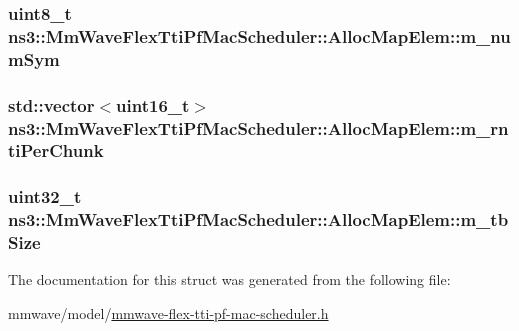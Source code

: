 \subsubsection[{\texorpdfstring{m\+\_\+num\+Sym}{m_numSym}}]{\setlength{\rightskip}{0pt plus 5cm}uint8\+\_\+t ns3\+::\+Mm\+Wave\+Flex\+Tti\+Pf\+Mac\+Scheduler\+::\+Alloc\+Map\+Elem\+::m\+\_\+num\+Sym}\hypertarget{structns3_1_1MmWaveFlexTtiPfMacScheduler_1_1AllocMapElem_a5c5cc7e33f85b68a50f52c334e025126}{}\label{structns3_1_1MmWaveFlexTtiPfMacScheduler_1_1AllocMapElem_a5c5cc7e33f85b68a50f52c334e025126}
\subsubsection[{\texorpdfstring{m\+\_\+rnti\+Per\+Chunk}{m_rntiPerChunk}}]{\setlength{\rightskip}{0pt plus 5cm}std\+::vector$<$uint16\+\_\+t$>$ ns3\+::\+Mm\+Wave\+Flex\+Tti\+Pf\+Mac\+Scheduler\+::\+Alloc\+Map\+Elem\+::m\+\_\+rnti\+Per\+Chunk}\hypertarget{structns3_1_1MmWaveFlexTtiPfMacScheduler_1_1AllocMapElem_a4f7acb21c722350e588ffb3786dff855}{}\label{structns3_1_1MmWaveFlexTtiPfMacScheduler_1_1AllocMapElem_a4f7acb21c722350e588ffb3786dff855}
\subsubsection[{\texorpdfstring{m\+\_\+tb\+Size}{m_tbSize}}]{\setlength{\rightskip}{0pt plus 5cm}uint32\+\_\+t ns3\+::\+Mm\+Wave\+Flex\+Tti\+Pf\+Mac\+Scheduler\+::\+Alloc\+Map\+Elem\+::m\+\_\+tb\+Size}\hypertarget{structns3_1_1MmWaveFlexTtiPfMacScheduler_1_1AllocMapElem_a3c8cbfc4ab84e3eee2edf8a5b66f5e78}{}\label{structns3_1_1MmWaveFlexTtiPfMacScheduler_1_1AllocMapElem_a3c8cbfc4ab84e3eee2edf8a5b66f5e78}


The documentation for this struct was generated from the following file\+:\begin{DoxyCompactItemize}
\item 
mmwave/model/\hyperlink{mmwave-flex-tti-pf-mac-scheduler_8h}{mmwave-\/flex-\/tti-\/pf-\/mac-\/scheduler.\+h}\end{DoxyCompactItemize}
